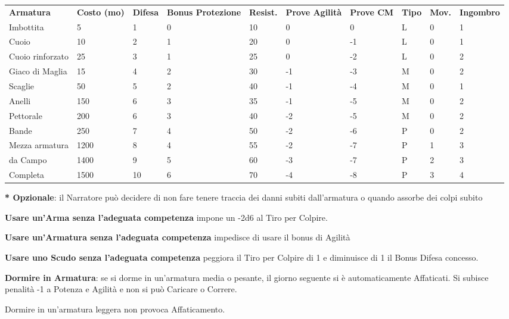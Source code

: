 \documentclass[a4paper,11pt,twoside,openany]{book}
\begin{document}
\label{tabella-armature}
\begin{tabularx}{0.95\textwidth}{lXXXXXXXXX}
	\toprule
	\textbf{Armatura} & \textbf{Costo (mo)} & \textbf{Difesa} & \textbf{Bonus Protezione } & \textbf{Resist.} & \textbf{Prove Agilità} & \textbf{Prove CM} & \textbf{Tipo} & \textbf{Mov.} & \textbf{Ingombro}\\
	Imbottita    & 5    & 1& 0 & 10   & 0   & 0  & L   & 0   & 1\\
	Cuoio   & 10   & 2& 1 & 20   & 0   & -1 & L   & 0   & 1\\
	Cuoio rinforzato  & 25   & 3& 1 & 25   & 0   & -2 & L   & 0   & 2\\
	Giaco di Maglia   & 15   & 4& 2 & 30   & -1  & -3 & M   & 0   & 2\\
	Scaglie & 50   & 5& 2 & 40   & -1  & -4 & M   & 0   & 1\\
	Anelli  & 150  & 6& 3 & 35   & -1  & -5 & M   & 0   & 2\\
	Pettorale    & 200  & 6& 3 & 40   & -2  & -5 & M   & 0   & 2\\
	Bande   & 250  & 7& 4 & 50   & -2  & -6 & P   & 0   & 2\\
	Mezza armatura    & 1200 & 8& 4 & 55   & -2  & -7 & P   & 1   & 3\\
	da Campo& 1400 & 9& 5 & 60   & -3  & -7 & P   & 2   & 3\\
	Completa& 1500 & 10    & 6 & 70   & -4  & -8 & P   & 3   & 4\\
\end{tabularx}

\textbf{{*} Opzionale}: il Narratore può decidere di non fare tenere traccia dei danni subiti dall'armatura o quando assorbe dei colpi subito

\bigskip

\textbf{Usare un'Arma senza l'adeguata competenza} impone un -2d6 al Tiro per Colpire.

\textbf{Usare un'Armatura senza l'adeguata competenza} impedisce di usare il bonus di Agilità

\textbf{Usare uno Scudo senza l'adeguata competenza} peggiora il Tiro per Colpire di 1 e diminuisce di 1 il Bonus Difesa concesso.

\textbf{Dormire in Armatura}: se si dorme in un'armatura media o pesante, il giorno seguente si è automaticamente Affaticati. Si subisce penalità -1 a Potenza e Agilità e non si può Caricare o Correre.

Dormire in un'armatura leggera non provoca Affaticamento.
\end{document}
